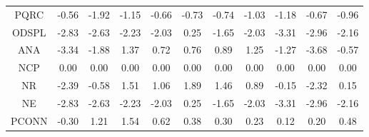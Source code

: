 \documentclass[11pt,a4paper]{report}
\begin{document}
\begin{longtable}{ | c || c | c | c | c | c | c | c | c | c || c |}
PQRC &  \cellcolor[HTML]{FFEFEF} -0.56 &  \cellcolor[HTML]{FFCFCF} -1.92 &  \cellcolor[HTML]{FFDFDF} -1.15 &  \cellcolor[HTML]{FFEFEF} -0.66 &  \cellcolor[HTML]{FFEFEF} -0.73 &  \cellcolor[HTML]{FFEFEF} -0.74 &  \cellcolor[HTML]{FFE7E7} -1.03 &  \cellcolor[HTML]{FFDFDF} -1.18 &  \cellcolor[HTML]{FFEFEF} -0.67 &  \cellcolor[HTML]{FFE7E7} -0.96 \\
ODSPL &  \cellcolor[HTML]{FFB7B7} -2.83 &  \cellcolor[HTML]{FFBFBF} -2.63 &  \cellcolor[HTML]{FFC7C7} -2.23 &  \cellcolor[HTML]{FFCFCF} -2.03 &  \cellcolor[HTML]{F7F7FF} 0.25 &  \cellcolor[HTML]{FFD7D7} -1.65 &  \cellcolor[HTML]{FFCFCF} -2.03 &  \cellcolor[HTML]{FFAFAF} -3.31 &  \cellcolor[HTML]{FFB7B7} -2.96 &  \cellcolor[HTML]{FFC7C7} -2.16 \\
ANA &  \cellcolor[HTML]{FFA7A7} -3.34 &  \cellcolor[HTML]{FFCFCF} -1.88 &  \cellcolor[HTML]{DFDFFF} 1.37 &  \cellcolor[HTML]{EFEFFF} 0.72 &  \cellcolor[HTML]{EFEFFF} 0.76 &  \cellcolor[HTML]{E7E7FF} 0.89 &  \cellcolor[HTML]{DFDFFF} 1.25 &  \cellcolor[HTML]{FFDFDF} -1.27 &  \cellcolor[HTML]{FF9F9F} -3.68 &  \cellcolor[HTML]{FFEFEF} -0.57 \\
NCP &  \cellcolor[HTML]{FFFFFF} 0.00 &  \cellcolor[HTML]{FFFFFF} 0.00 &  \cellcolor[HTML]{FFFFFF} 0.00 &  \cellcolor[HTML]{FFFFFF} 0.00 &  \cellcolor[HTML]{FFFFFF} 0.00 &  \cellcolor[HTML]{FFFFFF} 0.00 &  \cellcolor[HTML]{FFFFFF} 0.00 &  \cellcolor[HTML]{FFFFFF} 0.00 &  \cellcolor[HTML]{FFFFFF} 0.00 &  \cellcolor[HTML]{FFFFFF} 0.00 \\
NR &  \cellcolor[HTML]{FFBFBF} -2.39 &  \cellcolor[HTML]{FFEFEF} -0.58 &  \cellcolor[HTML]{D7D7FF} 1.51 &  \cellcolor[HTML]{E7E7FF} 1.06 &  \cellcolor[HTML]{CFCFFF} 1.89 &  \cellcolor[HTML]{D7D7FF} 1.46 &  \cellcolor[HTML]{E7E7FF} 0.89 &  \cellcolor[HTML]{FFFFFF} -0.15 &  \cellcolor[HTML]{FFC7C7} -2.32 &  \cellcolor[HTML]{FFFFFF} 0.15 \\
NE &  \cellcolor[HTML]{FFB7B7} -2.83 &  \cellcolor[HTML]{FFBFBF} -2.63 &  \cellcolor[HTML]{FFC7C7} -2.23 &  \cellcolor[HTML]{FFCFCF} -2.03 &  \cellcolor[HTML]{F7F7FF} 0.25 &  \cellcolor[HTML]{FFD7D7} -1.65 &  \cellcolor[HTML]{FFCFCF} -2.03 &  \cellcolor[HTML]{FFAFAF} -3.31 &  \cellcolor[HTML]{FFB7B7} -2.96 &  \cellcolor[HTML]{FFC7C7} -2.16 \\
PCONN &  \cellcolor[HTML]{FFF7F7} -0.30 &  \cellcolor[HTML]{DFDFFF} 1.21 &  \cellcolor[HTML]{D7D7FF} 1.54 &  \cellcolor[HTML]{EFEFFF} 0.62 &  \cellcolor[HTML]{F7F7FF} 0.38 &  \cellcolor[HTML]{F7F7FF} 0.30 &  \cellcolor[HTML]{F7F7FF} 0.23 &  \cellcolor[HTML]{FFFFFF} 0.12 &  \cellcolor[HTML]{F7F7FF} 0.20 &  \cellcolor[HTML]{EFEFFF} 0.48 \\

\end{longtable}
\end{document}
